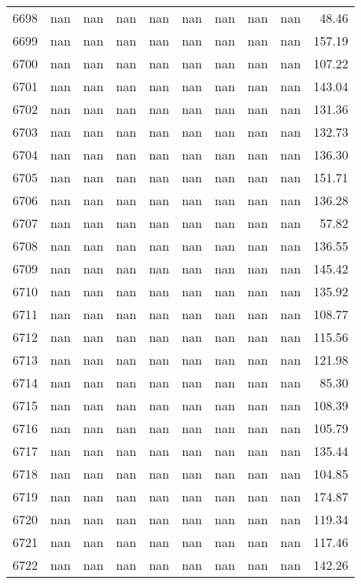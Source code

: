 \begin{tabular}{lrrrrrrrrr}
6698 & nan & nan & nan & nan & nan & nan & nan & nan & 48.46 \\
6699 & nan & nan & nan & nan & nan & nan & nan & nan & 157.19 \\
6700 & nan & nan & nan & nan & nan & nan & nan & nan & 107.22 \\
6701 & nan & nan & nan & nan & nan & nan & nan & nan & 143.04 \\
6702 & nan & nan & nan & nan & nan & nan & nan & nan & 131.36 \\
6703 & nan & nan & nan & nan & nan & nan & nan & nan & 132.73 \\
6704 & nan & nan & nan & nan & nan & nan & nan & nan & 136.30 \\
6705 & nan & nan & nan & nan & nan & nan & nan & nan & 151.71 \\
6706 & nan & nan & nan & nan & nan & nan & nan & nan & 136.28 \\
6707 & nan & nan & nan & nan & nan & nan & nan & nan & 57.82 \\
6708 & nan & nan & nan & nan & nan & nan & nan & nan & 136.55 \\
6709 & nan & nan & nan & nan & nan & nan & nan & nan & 145.42 \\
6710 & nan & nan & nan & nan & nan & nan & nan & nan & 135.92 \\
6711 & nan & nan & nan & nan & nan & nan & nan & nan & 108.77 \\
6712 & nan & nan & nan & nan & nan & nan & nan & nan & 115.56 \\
6713 & nan & nan & nan & nan & nan & nan & nan & nan & 121.98 \\
6714 & nan & nan & nan & nan & nan & nan & nan & nan & 85.30 \\
6715 & nan & nan & nan & nan & nan & nan & nan & nan & 108.39 \\
6716 & nan & nan & nan & nan & nan & nan & nan & nan & 105.79 \\
6717 & nan & nan & nan & nan & nan & nan & nan & nan & 135.44 \\
6718 & nan & nan & nan & nan & nan & nan & nan & nan & 104.85 \\
6719 & nan & nan & nan & nan & nan & nan & nan & nan & 174.87 \\
6720 & nan & nan & nan & nan & nan & nan & nan & nan & 119.34 \\
6721 & nan & nan & nan & nan & nan & nan & nan & nan & 117.46 \\
6722 & nan & nan & nan & nan & nan & nan & nan & nan & 142.26 \\

\end{tabular}
